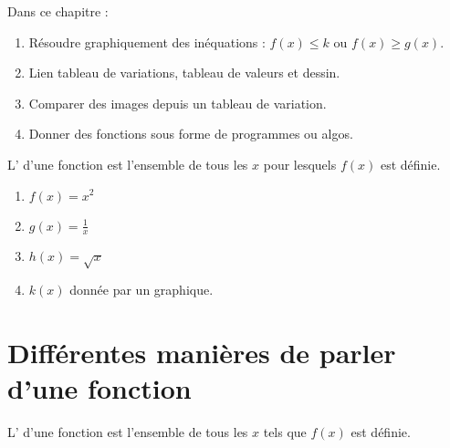 
Dans ce chapitre :
\begin{enumerate}
    \item
        Résoudre graphiquement des inéquations : \( f(x)\leq k\) ou \( f(x)\geq g(x)\).
    \item
        Lien tableau de variations, tableau de valeurs et dessin.
    \item
        Comparer des images depuis un tableau de variation.
    \item
        Donner des fonctions sous forme de programmes ou algos.
\end{enumerate}


\begin{definition}
    L' d'une fonction est l'ensemble de tous les \( x\) pour lesquels \( f(x)\) est définie.
\end{definition}

\begin{example}
    \begin{enumerate}
        \item
            \( f(x)=x^2\)
        \item
            \( g(x)=\frac{1}{ x }\)
        \item
            \( h(x)=\sqrt{x}\)
        \item
            \( k(x)\) donnée par un graphique.
    \end{enumerate}
\end{example}

\section{Différentes manières de parler d'une fonction}

\begin{definition}
    L' d'une fonction est l'ensemble de tous les \( x\) tels que \( f(x)\) est définie.
\end{definition}

